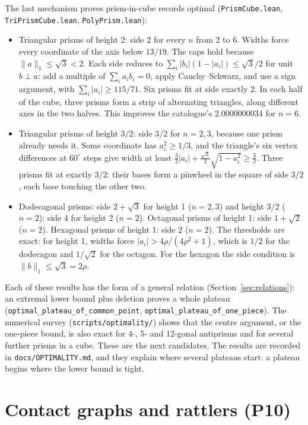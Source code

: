 \documentclass[11pt,a4paper]{article}
\newcommand{\code}[1]{\texttt{\nolinkurl{#1}}}
\newcommand{\lean}[1]{\texttt{#1}}
\theoremstyle{definition}
\theoremstyle{remark}
\begin{document}
The last mechanism proves \nPrism{} prism-in-cube records optimal (\code{PrismCube.lean}, \code{TriPrismCube.lean}, \code{PolyPrism.lean}):
\begin{itemize}
\item Triangular prisms of height 2: side 2 for every $n$ from 2 to 6. Widths force every coordinate of the axis below $13/19$. The caps hold because $\|a\|_1\le\sqrt3<2$. Each side reduces to $\sum_i|b_i|(1-|a_i|)\le\sqrt3/2$ for unit $b\perp a$: add a multiple of $\sum_ia_ib_i=0$, apply Cauchy--Schwarz, and use a sign argument, with $\sum_i|a_i|\ge 115/71$. Six prisms fit at side exactly 2. In each half of the cube, three prisms form a strip of alternating triangles, along different axes in the two halves. This improves the catalogue's $2.0000000034$ for $n=6$.
\item Triangular prisms of height $3/2$: side $3/2$ for $n=2,3$, because one prism already needs it. Some coordinate has $a_i^2\ge1/3$, and the triangle's six vertex differences at $60^\circ$ steps give width at least $\tfrac32|a_i|+\tfrac{\sqrt3}2\sqrt{1-a_i^2}\ge\tfrac32$. Three prisms fit at exactly $3/2$: their bases form a pinwheel in the square of side $3/2$, each base touching the other two.
\item Dodecagonal prisms: side $2+\sqrt3$ for height 1 ($n=2,3$) and height $3/2$ ($n=2$); side 4 for height 2 ($n=2$). Octagonal prisms of height 1: side $1+\sqrt2$ ($n=2$). Hexagonal prisms of height 1: side 2 ($n=2$). The thresholds are exact: for height 1, widths force $|a_i|>4\rho/(4\rho^2+1)$, which is $1/2$ for the dodecagon and $1/\sqrt2$ for the octagon. For the hexagon the side condition is $\|b\|_1\le\sqrt3=2\rho$.
\end{itemize}
Each of these results has the form of a general relation (Section~\ref{sec:relations}): an extremal lower bound plus deletion proves a whole plateau (\lean{optimal\_plateau\_of\_common\_point}, \lean{optimal\_plateau\_of\_one\_piece}). The numerical survey (\code{scripts/optimality/}) shows that the centre argument, or the one-piece bound, is also exact for 4-, 5- and 12-gonal antiprisms and for several further prisms in a cube. These are the next candidates. The results are recorded in \code{docs/OPTIMALITY.md}, and they explain where several plateaus start: a plateau begins where the lower bound is tight.

\section{Contact graphs and rattlers (P10)}\label{sec:contacts}
\end{document}
